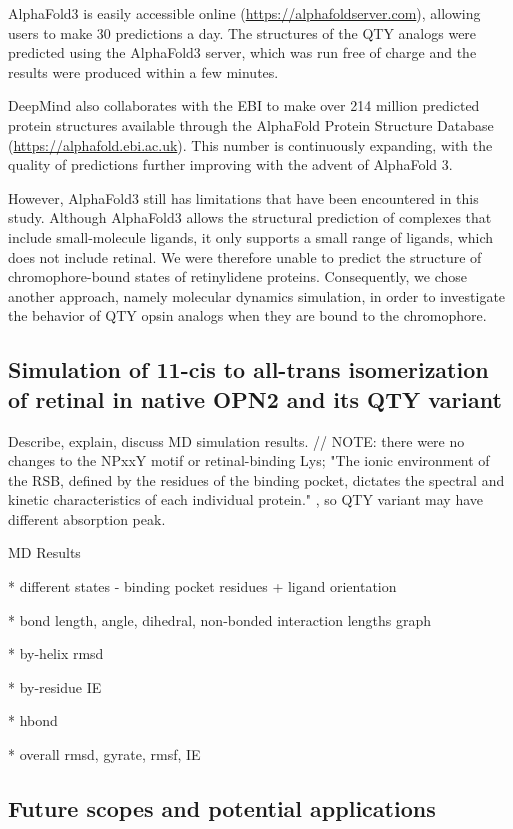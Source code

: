 \documentclass[fleqn, 10pt, lineno]{manuscript}
\begin{document}
AlphaFold3 is easily accessible online (\url{https://alphafoldserver.com}), allowing users to make 30 predictions a day. The structures of the QTY analogs were predicted using the AlphaFold3 server, which was run free of charge and the results were produced within a few minutes. 

DeepMind also collaborates with the EBI to make over 214 million predicted protein structures available through the AlphaFold Protein Structure Database (\url{https://alphafold.ebi.ac.uk}). This number is continuously expanding, with the quality of predictions further improving with the advent of AlphaFold 3. 

However, AlphaFold3 still has limitations that have been encountered in this study. Although AlphaFold3 allows the structural prediction of complexes that include small-molecule ligands, it only supports a small range of ligands, which does not include retinal. We were therefore unable to predict the structure of chromophore-bound states of retinylidene proteins. Consequently, we chose another approach, namely molecular dynamics simulation, in order to investigate the behavior of QTY opsin analogs when they are bound to the chromophore. 

\subsection*{Simulation of 11-cis to all-trans isomerization of retinal in native OPN2 and its QTY variant}

Describe, explain, discuss MD simulation results. // NOTE: there were no changes to the NPxxY motif or retinal-binding Lys; "The ionic environment of the RSB, defined by the residues of the binding pocket, dictates the spectral and kinetic characteristics of each individual protein." \citep{Fenno_2011}, so QTY variant may have different absorption peak. 

MD Results

* different states - binding pocket residues + ligand orientation

* bond length, angle, dihedral, non-bonded interaction lengths graph

* by-helix rmsd

* by-residue IE

* hbond

* overall rmsd, gyrate, rmsf, IE

\subsection*{Future scopes and potential applications}
\end{document}
